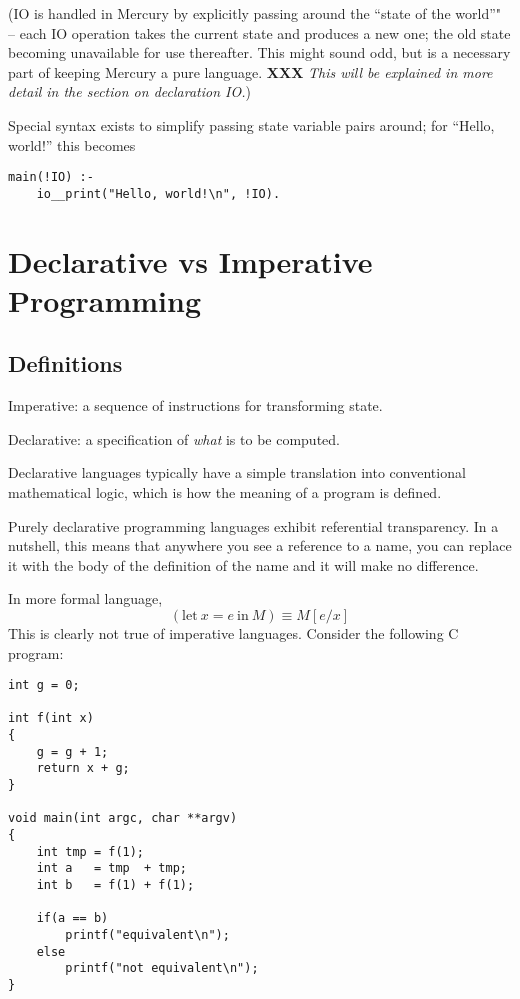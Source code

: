 \documentclass[a4paper,11pt,notitlepage,onecolumn]{article}
\newcommand{\XXX}[1]%
{{\small\textbf{XXX} \emph{#1}}}
\begin{document}
(IO is handled in Mercury by explicitly passing around the ``state
of the world''" -- each IO operation takes the current state and
produces a new one; the old state becoming unavailable for use
thereafter.  This might sound odd, but is a necessary part of
keeping Mercury a pure language.  \XXX{This will be explained in
more detail in the section on declaration IO.})

Special syntax exists to simplify passing state variable pairs
around; for ``Hello, world!'' this becomes
\begin{verbatim}
main(!IO) :-
    io__print("Hello, world!\n", !IO).
\end{verbatim}



\section{Declarative vs Imperative Programming}

\subsection{Definitions}

\begin{description}
\item{Imperative:} a sequence of instructions for transforming state.
\item{Declarative:} a specification of \emph{what} is to be computed.
\end{description}

Declarative languages typically have a simple translation into
conventional mathematical logic, which is how the meaning of a program
is defined.

Purely declarative programming languages exhibit referential
transparency.  In a nutshell, this means that anywhere you see a
reference to a name, you can replace it with the body of the
definition of the name and it will make no difference.

In more formal language,
\[
(\text{let}\ x = e\ \text{in}\ M)  \equiv  M[e/x]
\]
This is clearly not true of imperative languages.  Consider
the following C program:

\begin{verbatim}
int g = 0;

int f(int x)
{
    g = g + 1;
    return x + g;
}

void main(int argc, char **argv)
{
    int tmp = f(1);
    int a   = tmp  + tmp;
    int b   = f(1) + f(1);

    if(a == b)
        printf("equivalent\n");
    else
        printf("not equivalent\n");
}
\end{verbatim}
\end{document}
